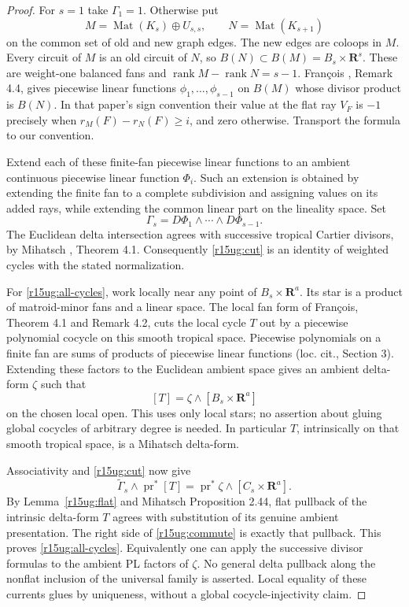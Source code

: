 \begin{proof}
For $s=1$ take $\Gamma_1=1$. Otherwise put
\[
 M=\operatorname{Mat}(K_s)\oplus U_{s,s},\qquad
 N=\operatorname{Mat}(K_{s+1})
\]
on the common set of old and new graph edges. The new edges
are coloops in $M$. Every circuit of $M$ is an old circuit of
$N$, so $B(N)\subset B(M)=B_s\times\mathbf R^s$.
These are weight-one balanced fans and
$\operatorname{rank}M-\operatorname{rank}N=s-1$.
Fran\c{c}ois \cite{Francois}, Remark 4.4, gives piecewise linear
functions $\phi_1,\ldots,\phi_{s-1}$ on $B(M)$ whose divisor
product is $B(N)$. In that paper's sign convention their value
at the flat ray $V_F$ is $-1$ precisely when
$r_M(F)-r_N(F)\geq i$, and zero otherwise. Transport the formula
to our convention.

Extend each of these finite-fan piecewise linear functions to
an ambient continuous piecewise linear function $\Phi_i$.
Such an extension is obtained by extending the finite fan to a
complete subdivision and assigning values on its added rays,
while extending the common linear part on the lineality space.
Set
\[
                       \Gamma_s=D\Phi_1\wedge\cdots
                                            \wedge D\Phi_{s-1}.
\tag{UG15.5}\label{r15ug:explicit}
\]
The Euclidean delta intersection agrees with successive tropical
Cartier divisors, by Mihatsch \cite{MihatschIntersection},
Theorem 4.1. Consequently \eqref{r15ug:cut} is an identity of
weighted cycles with the stated normalization.

For \eqref{r15ug:all-cycles}, work locally near any point of
$B_s\times\mathbf R^a$. Its star is a product of matroid-minor
fans and a linear space. The local fan form of Fran\c{c}ois,
Theorem 4.1 and Remark 4.2, cuts the local cycle $T$ out by a
piecewise polynomial cocycle on this smooth tropical space.
Piecewise polynomials on a finite fan are sums of products of
piecewise linear functions (loc. cit., Section 3). Extending
these factors to the Euclidean ambient space gives an ambient
delta-form $\zeta$ such that
\[
                 [T]=\zeta\wedge[B_s\times\mathbf R^a]
\tag{UG15.6}\label{r15ug:local-cut}
\]
on the chosen local open. This uses only local stars; no assertion
about gluing global cocycles of arbitrary degree is needed.
In particular $T$, intrinsically on that smooth tropical space,
is a Mihatsch delta-form.

Associativity and \eqref{r15ug:cut} now give
\[
 \widetilde\Gamma_s\wedge\operatorname{pr}^*[T]
       =\operatorname{pr}^*\zeta\wedge[C_s\times\mathbf R^a].
\tag{UG15.7}\label{r15ug:commute}
\]
By Lemma~\ref{r15ug:flat} and Mihatsch Proposition 2.44, flat
pullback of the intrinsic delta-form $T$ agrees with substitution
of its genuine ambient presentation. The right side of
\eqref{r15ug:commute} is exactly that pullback. This proves
\eqref{r15ug:all-cycles}. Equivalently one can apply the
successive divisor formulas to the ambient PL factors of $\zeta$.
No general delta pullback along the nonflat inclusion of the
universal family is asserted. Local equality of these currents
glues by uniqueness, without a global cocycle-injectivity claim.
\end{proof}

